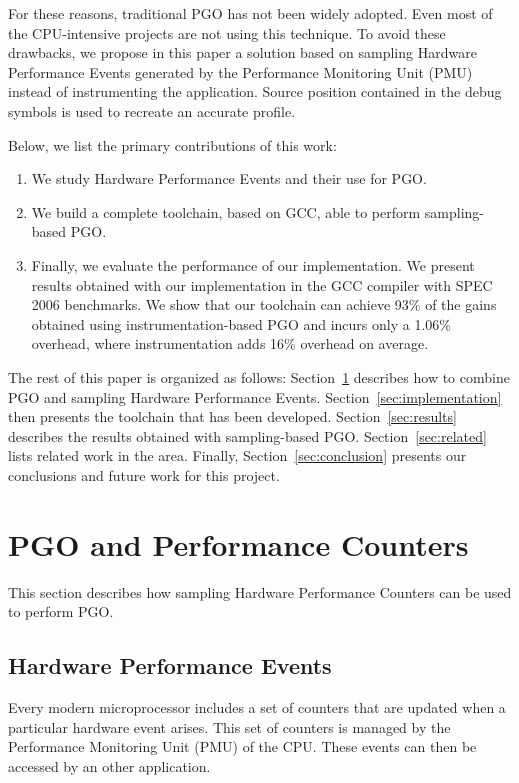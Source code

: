 \documentclass[9pt,english,twocolumn,letter]{article}
\begin{document}
For these reasons, traditional PGO has not been widely adopted. Even most of the CPU-intensive projects are not using this technique. To avoid these drawbacks, we propose in this paper a solution based on sampling Hardware Performance Events generated by the Performance Monitoring Unit (PMU) instead of instrumenting the application. Source position contained in the debug symbols is used to recreate an accurate profile.

Below, we list the primary contributions of this work:
\begin{enumerate}
    \item We study Hardware Performance Events and their use for PGO.
    \item We build a complete toolchain, based on GCC, able to perform sampling-based PGO.
    \item Finally, we evaluate the performance of our implementation. We present results obtained with our implementation in the GCC compiler with SPEC 2006 benchmarks. We show that our toolchain can achieve 93\% of the gains obtained using instrumentation-based PGO and incurs only a 1.06\% overhead, where instrumentation adds 16\% overhead on average.
\end{enumerate}

The rest of this paper is organized as follows: Section~\ref{sec:pgo-counters} describes how to combine PGO and sampling Hardware Performance Events. Section~\ref{sec:implementation} then presents the toolchain that has been developed. Section~\ref{sec:results} describes the results obtained with sampling-based PGO. Section~\ref{sec:related} lists related work in the area. Finally, Section~\ref{sec:conclusion} presents our conclusions and future work for this project.

\section{PGO and Performance Counters}
\label{sec:pgo-counters}

This section describes how sampling Hardware Performance Counters can be used to perform PGO.

\subsection{Hardware Performance Events}

Every modern microprocessor includes a set of counters that are updated when a particular hardware event arises. This set of counters is managed by the Performance Monitoring Unit (PMU) of the CPU. These events can then be accessed by an other application.
\end{document}
